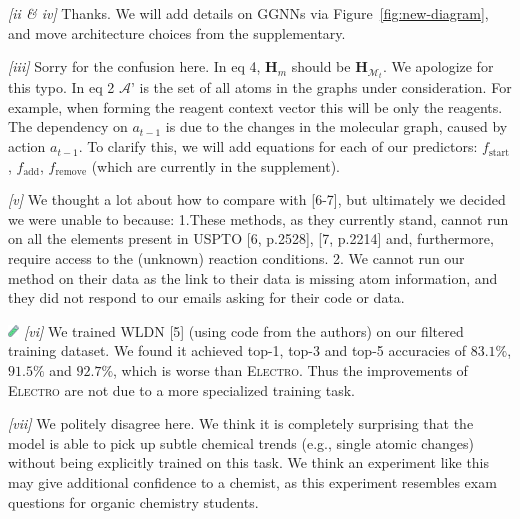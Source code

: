 \documentclass{article}
\newcommand{\ourModel}{\textsc{Electro}\xspace}
\begin{document}
\emph{[ii \& iv]}
Thanks. We will add details on GGNNs via Figure~\ref{fig:new-diagram}, and move architecture choices from the supplementary.

\emph{[iii]} 
Sorry for the confusion here. In eq 4, $\mathbf{H}_m$ should be $\mathbf{H}_{\mathcal{M}_t}$. We apologize for this typo.
In eq 2 $\mathcal{A}’$ is the set of all atoms in the graphs under consideration. For example, when forming the reagent context vector this will be only the reagents.
The dependency on $a_{t-1}$ is due to the changes in the molecular graph, caused by action $a_{t-1}$. 
To clarify this, we will add equations for each of our predictors: $f_\textrm{start}$, $f_\textrm{add}$, $f_\textrm{remove}$ (which are currently in the supplement).

\emph{[v]} 
We thought a lot about how to compare with [6-7], but
 ultimately we decided we were unable to because:
  1.These methods, as they currently stand, cannot run on all the elements present in USPTO [6, p.2528], [7, p.2214] and, furthermore, require access to the (unknown) reaction conditions. 
 2. We cannot run our method on their data as the link to their data is missing atom information, and they did not respond to our emails asking for their code or data. 

\includegraphics[width=0.3cm]{testtube.png} \emph{[vi]} We trained WLDN [5] (using code from the authors) on our filtered training dataset.
 We found it achieved top-1, top-3 and top-5 accuracies of $83.1\%$, $91.5\%$ and $92.7\%$, which is worse than \ourModel. 
 Thus the improvements of \ourModel are not due to a more specialized training task.
  
\emph{[vii]}
 We politely disagree here.
  We think it is completely surprising that the model is able to pick up subtle chemical trends (e.g., single atomic changes) without being explicitly trained on this task.
   We think an experiment like this may give additional confidence to a chemist, %
   as this experiment resembles exam questions for organic chemistry students. %
 
\end{document}

